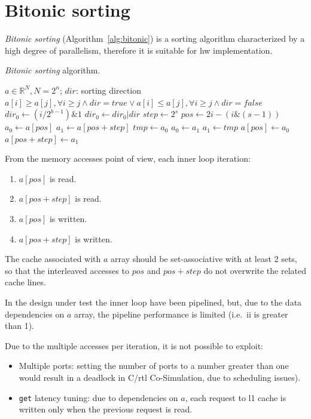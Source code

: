 \documentclass[11pt,a4paper,oneside]{memoir}
\begin{document}
\clearpage

\section{Bitonic sorting}
\emph{Bitonic sorting} (Algorithm~\ref{alg:bitonic}) is a sorting algorithm
characterized by a high degree of parallelism, therefore it is suitable for
\acl{hw} implementation.

\begin{algorithm}
	\caption{\emph{Bitonic sorting} algorithm.}\label{alg:bitonic}
	\begin{algorithmic}
		\Require $a \in \mathbb{R}^N, N = 2^n$; $dir$: sorting direction
		\Ensure $a[i] \geq a[j], \forall i \geq j \wedge dir = true \vee
			a[i] \leq a[j], \forall i \geq j \wedge dir = false$
						\State $dir_0 \gets
							(i/2^{b - 1}) \& 1$
						\State $dir_0 \gets dir_0 | dir$
						\State $step \gets 2^s$
						\State $pos \gets 2 i -
							(i \& (s - 1))$
						\State $a_0 \gets a[pos]$
						\State $a_1 \gets a[pos + step]$
							\State $tmp \gets a_0$
							\State $a_0 \gets a_1$
							\State $a_1 \gets tmp$
						\EndIf
						\State $a[pos] \gets a_0$
						\State $a[pos + step] \gets a_1$
					\EndFor
				\EndFor
			\EndFor
		\EndProcedure
	\end{algorithmic}
\end{algorithm}

From the memory accesses point of view, each inner loop iteration:
\begin{enumerate}
	\item $a[pos]$ is read.
	\item $a[pos+step]$ is read.
	\item $a[pos]$ is written.
	\item $a[pos+step]$ is written.
\end{enumerate}

The cache associated with $a$ array should be set-associative with at least 2
sets, so that the interleaved accesses to $pos$ and $pos + step$ do not
overwrite the related cache lines.

In the design under test the inner loop have been pipelined, but, due to the
data dependencies on $a$ array, the pipeline performance is limited (i.e.\
\ac{ii} is greater than 1).

Due to the multiple accesses per iteration, it is not possible to exploit:
\begin{itemize}
	\item Multiple ports: setting the number of ports to a number greater
		than one would result in a deadlock in C/\ac{rtl}
		Co-Simulation, due to scheduling issues).
	\item \texttt{get} latency tuning: due to dependencies on $a$, each
		request to \ac{l1} cache is written only when the previous
		request is read.
\end{itemize}
\end{document}
